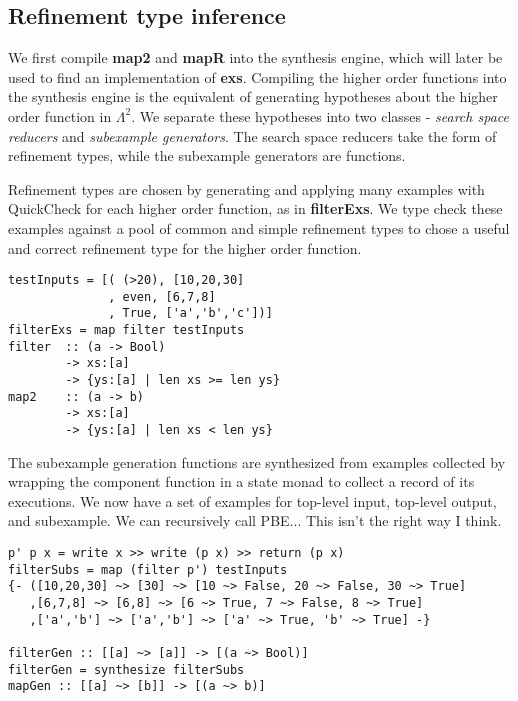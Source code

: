 
\subsection{Refinement type inference}
We first compile \textbf{map2} and \textbf{mapR} into the synthesis engine, which will later be used to find an implementation of \textbf{exs}.
Compiling the higher order functions into the synthesis engine is the equivalent of generating hypotheses about the higher order function in $\Lambda^2$.
We separate these hypotheses into two classes - \textit{search space reducers} and \textit{subexample generators}.
The search space reducers take the form of refinement types, while the subexample generators are functions.

Refinement types are chosen by generating and applying many examples with QuickCheck for each higher order function, as in \textbf{filterExs}.
We type check these examples against a pool of common and simple refinement types to chose a useful and correct refinement type for the higher order function.

\begin{verbatim}
testInputs = [( (>20), [10,20,30]
              , even, [6,7,8]
              , True, ['a','b','c'])]
filterExs = map filter testInputs
filter  :: (a -> Bool)
        -> xs:[a]
        -> {ys:[a] | len xs >= len ys}
map2    :: (a -> b)
        -> xs:[a]
        -> {ys:[a] | len xs < len ys}
\end{verbatim}

The subexample generation functions are synthesized from examples collected by wrapping the component function in a state monad to collect a record of its executions.
We now have a set of examples for top-level input, top-level output, and subexample.
We can recursively call PBE... This isn't the right way I think.


\begin{verbatim}
p' p x = write x >> write (p x) >> return (p x)
filterSubs = map (filter p') testInputs
{- ([10,20,30] ~> [30] ~> [10 ~> False, 20 ~> False, 30 ~> True]
   ,[6,7,8] ~> [6,8] ~> [6 ~> True, 7 ~> False, 8 ~> True]
   ,['a','b'] ~> ['a','b'] ~> ['a' ~> True, 'b' ~> True] -}
   
filterGen :: [[a] ~> [a]] -> [(a ~> Bool)]
filterGen = synthesize filterSubs
mapGen :: [[a] ~> [b]] -> [(a ~> b)]
\end{verbatim}
